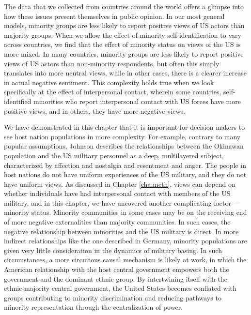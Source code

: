 
The data that we collected from countries around the world offers a glimpse into how these issues present themselves in public opinion. In our most general models, minority groups are less likely to report positive views of US actors than majority groups. When we allow the effect of minority self-identification to vary across countries, we find that the effect of minority status on views of the US is more mixed. In many countries, minority groups are less likely to report positive views of US actors than non-minority respondents, but often this simply translates into more neutral views, while in other cases, there is a clearer increase in actual negative sentiment. This complexity holds true when we look specifically at the effect of interpersonal contact, wherein some countries, self-identified minorities who report interpersonal contact with US forces have more positive views, and in others, they have more negative views. 


We have demonstrated in this chapter that it is important for decision-makers to see host nation populations in more complexity. For example, contrary to many popular assumptions, Johnson describes the relationships between the Okinawan population and the US military personnel as a deep, multilayered subject, characterized by affection and nostalgia and resentment and anger.\cite{Johnson2019} The people in host nations do not have uniform experiences of the US military, and they do not have uniform views. As discussed in Chapter \ref{cha:meth}, views can depend on whether individuals have had interpersonal contact with members of the US military, and in this chapter, we have uncovered another complicating factor --- minority status. Minority communities in some cases may be on the receiving end of more negative externalities than majority communities. In such cases, the negative relationship between minorities and the US military is direct. In more indirect relationships like the one described in Germany, minority populations are given very little consideration in the dynamics of military basing. In such circumstances, a more circuitous causal mechanism is likely at work, in which the American relationship with the host central government empowers both the government and the dominant ethnic group. By intertwining itself with the ethnic-majority central government, the United States becomes conflated with groups contributing to minority discrimination and reducing pathways to minority representation through the centralization of power. 

